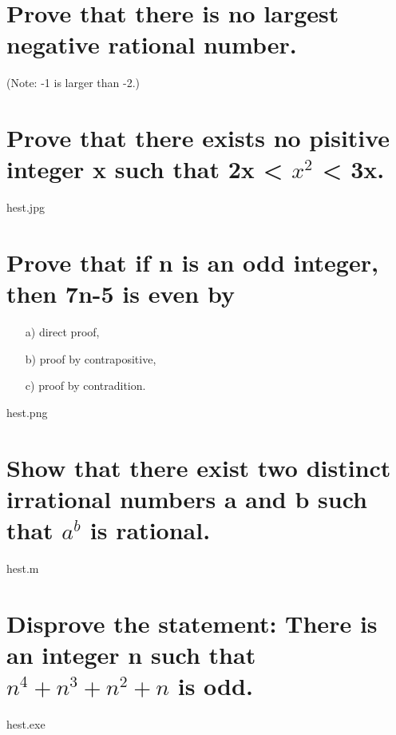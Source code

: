 \section{Prove that there is no largest negative rational number.}
(Note: -1 is larger than -2.)

\section{Prove that there exists no pisitive integer x such that 2x < $x^2$ < 3x.}
hest.jpg

\section{Prove that if n is an odd integer, then 7n-5 is even by}
\begin{itemize}
\item[a)] direct proof,
\item[b)] proof by contrapositive,
\item[c)] proof by contradition.
\end{itemize}
hest.png

\section{Show that there exist two distinct irrational numbers a and b such that $a^b$ is rational.}
hest.m

\section{Disprove the statement: There is an integer n such that $n^4+n^3+n^2+n$ is odd.}
hest.exe